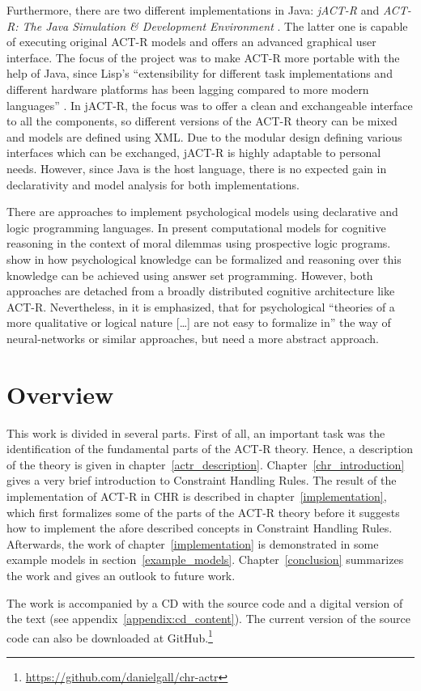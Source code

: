 Furthermore, there are two different implementations in Java: \emph{jACT-R} \cite{jactr} and \emph{ACT-R: The Java Simulation \& Development Environment} \cite{java_actr}. The latter one is capable of executing original ACT-R models and offers an advanced graphical user interface. The focus of the project was to make ACT-R more portable with the help of Java, since Lisp's ``extensibility for different task implementations and different hardware platforms has been lagging compared to more modern languages'' \cite{java_actr_benefits}. In jACT-R, the focus was to offer a clean and exchangeable interface to all the components, so different versions of the ACT-R theory can be mixed \cite{jactr_benefits} and models are defined using XML. Due to the modular design defining various interfaces which can be exchanged, jACT-R is highly adaptable to personal needs. However, since Java is the host language, there is no expected gain in declarativity and model analysis for both implementations.

There are approaches to implement psychological models using declarative and logic programming languages. In \cite{pereira_modellingmorality_2007} \citeauthor{pereira_modellingmorality_2007} present computational models for cognitive reasoning in the context of moral dilemmas using prospective logic programs. \citeauthor{balduccini_formalization_2010} show in \cite{balduccini_formalization_2010} how psychological knowledge can be formalized and reasoning over this knowledge can be achieved using answer set programming. However, both approaches are detached from a broadly distributed cognitive architecture like ACT-R. Nevertheless, in \cite[726]{balduccini_formalization_2010} it is emphasized, that for psychological ``theories of a more qualitative or logical nature [\dots] are not easy to formalize in'' the way of neural-networks or similar approaches, but need a more abstract approach.

\section{Overview}

This work is divided in several parts. First of all, an important task was the identification of the fundamental parts of the ACT-R theory. Hence, a description of the theory is given in chapter~\ref{actr_description}. Chapter~\ref{chr_introduction} gives a very brief introduction to Constraint Handling Rules. The result of the implementation of ACT-R in CHR is described in chapter~\ref{implementation}, which first formalizes some of the parts of the ACT-R theory before it suggests how to implement the afore described concepts in Constraint Handling Rules. Afterwards, the work of chapter~\ref{implementation} is demonstrated in some example models in section~\ref{example_models}. Chapter~\ref{conclusion} summarizes the work and gives an outlook to future work.

The work is accompanied by a CD with the source code and a digital version of the text (see appendix~\ref{appendix:cd_content}). The current version of the source code can also be downloaded at GitHub.\footnote{\url{https://github.com/danielgall/chr-actr}}
